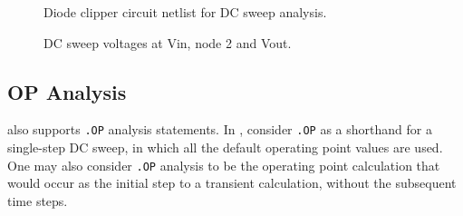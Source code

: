 \begin{figure}[htbp]
\begin{centering}
\caption{Diode clipper circuit netlist for DC sweep analysis.\label{Clipper_Netlist3}}

\end{centering}
\end{figure}

\begin{figure}[htbp]
\begin{centering}
\caption{DC sweep voltages at Vin, node 2 and Vout.\label{Clipper_DCSweep2}}
\end{centering}
\end{figure}

\subsection{OP Analysis}
\label{OP_Analysis}

\Xyce{} also supports \texttt{.OP} analysis statements.  In \Xyce{}, consider \texttt{.OP} as a shorthand for a single-step DC sweep, in which all the default operating point values are used.  One may also consider
\texttt{.OP} analysis to be the operating point calculation that would occur as the initial step to a transient calculation, without the subsequent time steps.

